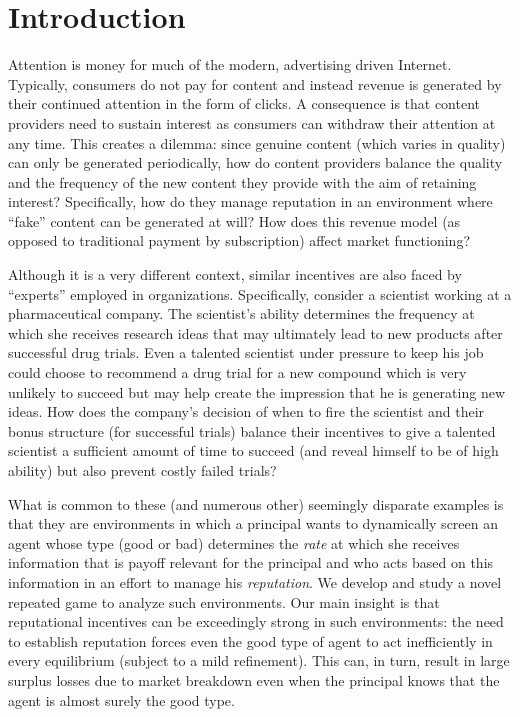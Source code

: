 \documentclass[11pt,reqno]{amsart}
\begin{document}
\maketitle

\section{Introduction}\label{sec:intro}

Attention is money for much of the modern, advertising driven Internet. Typically, consumers do not pay for content and instead revenue is generated by their continued attention in the form of clicks. A consequence is that content providers need to sustain interest as consumers can withdraw their attention at any time. This creates a dilemma: since genuine content (which varies in quality) can only be generated periodically, how do content providers balance the quality and the frequency of the new content they provide with the aim of retaining interest? Specifically, how do they manage reputation in an environment where ``fake'' content can be generated at will? How does this revenue model (as opposed to traditional payment by subscription) affect market functioning?

Although it is a very different context, similar incentives are also faced by ``experts'' employed in organizations. Specifically, consider a scientist working at a pharmaceutical company. The scientist's ability determines the frequency at which she receives research ideas that may ultimately lead to new products after successful drug trials. Even a talented scientist under pressure to keep his job could choose to recommend a drug trial for a new compound which is very unlikely to succeed but may help create the impression that he is generating new ideas. How does the company's decision of when to fire the scientist and their bonus structure (for successful trials) balance their incentives to give a talented scientist a sufficient amount of time to succeed (and reveal himself to be of high ability) but also prevent costly failed trials?

What is common to these (and numerous other) seemingly disparate examples is that they are environments in which a principal wants to dynamically screen an agent whose type (good or bad) determines the \emph{rate} at which she receives information that is payoff relevant for the principal and who acts based on this information in an effort to manage his \textit{reputation}. We develop and study a novel repeated game to analyze such environments. Our main insight is that reputational incentives can be exceedingly strong in such environments: the need to establish reputation forces even the good type of agent to act inefficiently in every equilibrium (subject to a mild refinement). This can, in turn, result in large surplus losses due to market breakdown even when the principal knows that the agent is almost surely the good type.
\end{document}
